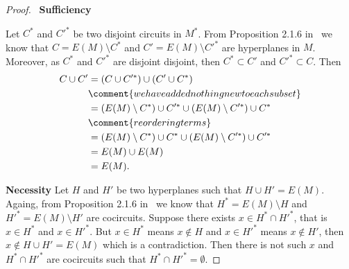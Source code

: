 \begin{proof}
    $\,$\pn
    \textbf{Sufficiency}\pn
    
    Let $C^*$ and $C'^*$ be two disjoint circuits in $M^*$. From Proposition 2.1.6 in~\cite{Oxley} we know that 
    $C = E(M) \setminus C^*$ and $C' = E(M) \setminus C'^*$ are hyperplanes in $M$. Moreover, as $C^*$ and $C'^*$ are disjoint 
    disjoint, then $C^* \subset C'$ and $C'^* \subset C$. Then 
    \begin{align}
        C \cup C'   &=  (C \cup C'^*) \cup (C' \cup C^*)                                    \\
                    &\comment{we have added nothing new to each subset}                     \\
                    &=  (E(M) \setminus C^*) \cup C'^* \cup  (E(M) \setminus C'^*) \cup C^* \\
                    &\comment{reordering terms}                                             \\
                    &=  (E(M) \setminus C^*) \cup C^* \cup  (E(M) \setminus C'^*) \cup C'^* \\
                    &=  E(M) \cup  E(M)                                                     \\
                    &=  E(M).
    \end{align}
    
    \textbf{Necessity}\pn
    Let $H$ and $H'$ be two hyperplanes such that $H \cup H' = E(M)$. Againg, from Proposition 2.1.6 in~\cite{Oxley} we know that
    $H^* = E(M) \setminus H$ and $H'^* = E(M) \setminus H'$ are cocircuits. Suppose there exists $x \in H^* \cap H'^*$, that is
    $x \in H^*$ and $x \in H'^*$. But $x \in H^*$ means $x \not\in H$ and $x \in H'^*$ means $x\not\in H'$, 
    then $x \notin H \cup H' = E(M)$ which is a contradiction. Then there is not such $x$ and $H^* \cap H'^*$ are cocircuits such that
    $H^* \cap H'^* = \emptyset$.
\end{proof}
